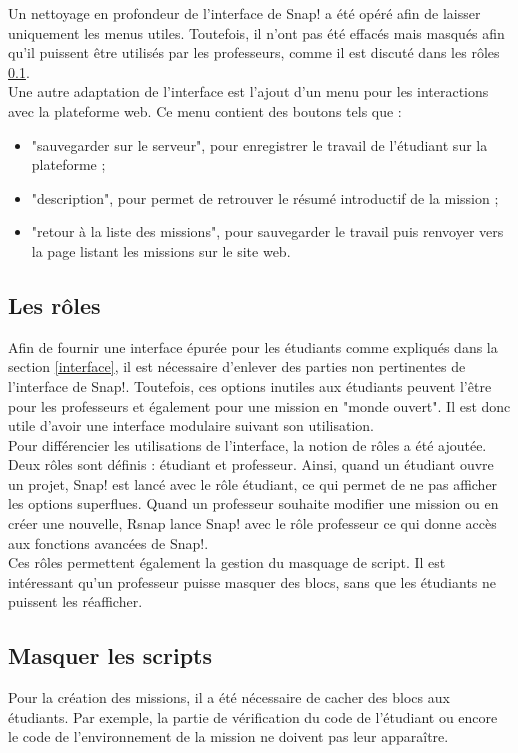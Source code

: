 Un nettoyage en profondeur de l'interface de Snap! a été opéré afin de laisser uniquement les menus utiles. Toutefois, il n'ont pas été effacés mais masqués afin qu'il puissent être utilisés par les professeurs, comme il est discuté dans les rôles \ref{role}.\\

Une autre adaptation de l'interface est l'ajout d'un menu pour les interactions avec la plateforme web. Ce menu contient des boutons tels que : 
\begin{itemize}
  \item "sauvegarder sur le serveur", pour enregistrer le travail de l'étudiant sur la plateforme ; 
  \item "description", pour permet de retrouver le résumé introductif de la mission ; 
  \item "retour à la liste des missions", pour sauvegarder le travail puis renvoyer vers la page listant les missions sur le site web.
\end{itemize}

\subsection{Les rôles}
\label{role}
Afin de fournir une interface épurée pour les étudiants comme expliqués dans la section \ref{interface}, il est nécessaire d'enlever des parties non pertinentes de l'interface de Snap!. Toutefois, ces options inutiles aux étudiants peuvent l'être pour les professeurs et également pour une mission en "monde ouvert". Il est donc utile d'avoir une interface modulaire suivant son utilisation. \\

Pour différencier les utilisations de l'interface, la notion de rôles a été ajoutée. Deux rôles sont définis : étudiant et professeur. Ainsi, quand un étudiant ouvre un projet, Snap! est lancé avec le rôle étudiant, ce qui permet de ne pas afficher les options superflues. Quand un professeur souhaite modifier une mission ou en créer une nouvelle, Rsnap lance Snap! avec le rôle professeur ce qui donne accès aux fonctions avancées de Snap!.\\

Ces rôles permettent également la gestion du masquage de script. Il est intéressant qu'un professeur puisse masquer des blocs, sans que les étudiants ne puissent les réafficher.

\subsection{Masquer les scripts}
Pour la création des missions, il a été nécessaire de cacher des blocs aux étudiants. Par exemple, la partie de vérification du code de l'étudiant ou encore le code de l'environnement de la mission ne doivent pas leur apparaître. 

